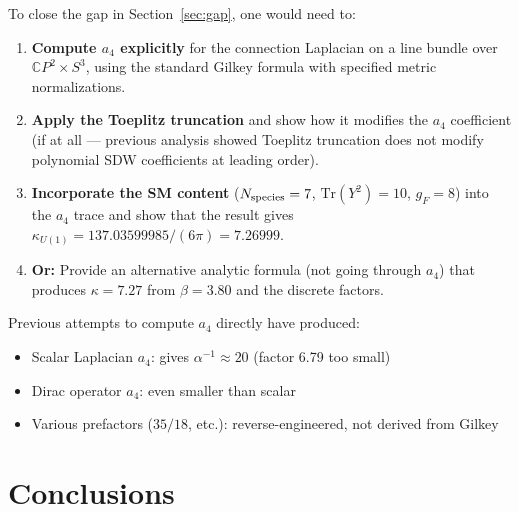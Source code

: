 \documentclass[12pt,a4paper]{article}
\begin{document}
To close the gap in Section~\ref{sec:gap}, one would need to:

\begin{enumerate}
\item \textbf{Compute $a_4$ explicitly} for the connection Laplacian
  on a line bundle over $\mathbb{C}P^2 \times S^3$, using the
  standard Gilkey formula with specified metric normalizations.

\item \textbf{Apply the Toeplitz truncation} and show how it
  modifies the $a_4$ coefficient (if at all --- previous analysis
  showed Toeplitz truncation does not modify polynomial SDW
  coefficients at leading order).

\item \textbf{Incorporate the SM content} ($N_{\rm species} = 7$,
  $\text{Tr}(Y^2) = 10$, $g_F = 8$) into the $a_4$ trace and
  show that the result gives
  $\kappa_{U(1)} = 137.03599985/(6\pi) = 7.26999$.

\item \textbf{Or:} Provide an alternative analytic formula
  (not going through $a_4$) that produces $\kappa = 7.27$ from
  $\beta = 3.80$ and the discrete factors.
\end{enumerate}

Previous attempts to compute $a_4$ directly have produced:
\begin{itemize}
\item Scalar Laplacian $a_4$: gives $\alpha^{-1} \approx 20$
  (factor 6.79 too small)
\item Dirac operator $a_4$: even smaller than scalar
\item Various prefactors ($35/18$, etc.): reverse-engineered,
  not derived from Gilkey
\end{itemize}

\section{Conclusions}
\label{sec:conclusions}
\end{document}
